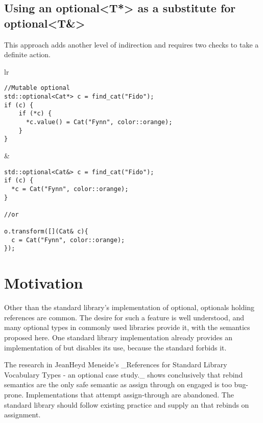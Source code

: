 \documentclass[a4paper,10pt,oneside,openany,final,article]{memoir}
\begin{document}
  \section{Using an optional<T*> as a substitute for optional<T\&>}

This approach adds another level of indirection and requires two checks to take a definite action.

  \begin{tabular}{ lr }
  \begin{minipage}[t]{0.45\columnwidth}
    \begin{verbatim}
//Mutable optional
std::optional<Cat*> c = find_cat("Fido");
if (c) {
    if (*c) {
      *c.value() = Cat("Fynn", color::orange);
    }
}

    \end{verbatim}
  \end{minipage}
  &
    \begin{minipage}[t]{0.45\columnwidth}
      \begin{verbatim}
std::optional<Cat&> c = find_cat("Fido");
if (c) {
  *c = Cat("Fynn", color::orange);
}

//or

o.transform([](Cat& c){
  c = Cat("Fynn", color::orange);
});
        \end{verbatim}
      \end{minipage}
\end{tabular}

\chapter{Motivation}
Other than the standard library's implementation of optional, optionals holding references are common. The desire for such a feature is well understood, and many optional types in commonly used libraries provide it, with the semantics proposed here.
One standard library implementation already provides an implementation of  but disables its use, because the standard forbids it.

The research in JeanHeyd Meneide's _References for Standard Library Vocabulary Types - an optional case study._ \cite{P1683R0} shows conclusively that rebind semantics are the only safe semantic as assign through on engaged is too bug-prone. Implementations that attempt assign-through are abandoned. The standard library should follow existing practice and supply an  that rebinds on assignment.
\end{document}
